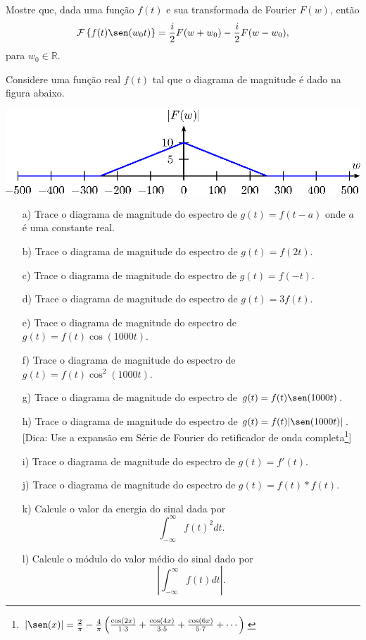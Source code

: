 \begin{exer}{\label{ex_mod_sin}}Mostre que, dada uma função $f(t)$ e sua transformada de Fourier $F(w)$, então
\begin{equation}
\mathcal{F}\left\{f(t)\sen(w_0t) \right\}=\frac{i}{2}F(w+w_0)-\frac{i}{2 }F(w-w_0),
\end{equation}
para $w_0\in\mathbb{R}$.
\end{exer}
\begin{exer}Considere uma função real $f(t)$ tal que o diagrama de magnitude é dado na figura abaixo. 
\begin{center}
\includegraphics{cap_propriedades_transformada/pics/figura_13}\end{center}
\begin{itemize}
\item[a)] Trace o diagrama de magnitude do espectro de $g(t)=f(t-a)$ onde $a$ é uma constante real.
\item[b)] Trace o diagrama de magnitude do espectro de $g(t)=f(2t)$.
\item[c)] Trace o diagrama de magnitude do espectro de $g(t)=f(-t)$.
\item[d)] Trace o diagrama de magnitude do espectro de $g(t)=3f(t)$.
\item[e)] Trace o diagrama de magnitude do espectro de $g(t)=f(t)\cos(1000t)$.
\item[f)] Trace o diagrama de magnitude do espectro de $g(t)=f(t)\cos^2(1000t)$.
\item[g)] Trace o diagrama de magnitude do espectro de $g(t)=f(t)\sen(1000t)$.
\item[h)] Trace o diagrama de magnitude do espectro de $g(t)=f(t)|\sen(1000t)|$. [Dica: Use a expansão em Série de Fourier do retificador de onda completa\footnote{$|\sen(x)|=\frac{2}{\pi}-\frac{4}{\pi}\left(\frac{\cos(2x)}{1\cdot 3}+\frac{\cos(4x)}{3\cdot 5}+\frac{\cos(6x)}{5\cdot 7}+\cdots\right)$}]
\item[i)] Trace o diagrama de magnitude do espectro de $g(t)=f'(t)$.
\item[j)] Trace o diagrama de magnitude do espectro de $g(t)=f(t)\ast f(t)$.
\item[k)] Calcule o valor da energia do sinal dada por \begin{equation}\int_{-\infty}^\infty f(t)^2dt.\end{equation}
\item[l)] Calcule o módulo do valor médio do sinal dado por \begin{equation}\left|\int_{-\infty}^\infty f(t)dt\right|.\end{equation}
\end{itemize}
 \end{exer}
